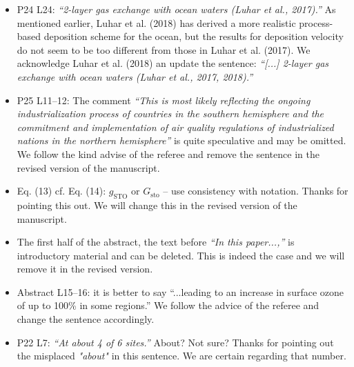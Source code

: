 \documentclass{scrartcl}
\begin{document}
\begin{itemize}
\item {\color{blue}  P24 L24: \emph{“2-layer gas exchange with ocean waters (Luhar et al., 2017).”}
As mentioned earlier, Luhar et al. (2018) has derived a more realistic process-based
deposition scheme for the ocean, but the results for deposition velocity do not seem to
be too different from those in Luhar et al. (2017).}
  We acknowledge Luhar et al. (2018) an update the sentence:
  \emph{“[...] 2-layer gas exchange with ocean waters (Luhar et al., 2017, 2018).”}
  
\item {\color{blue}  P25 L11--12: The comment \emph{“This is most likely reflecting the ongoing
industrialization process of countries in the southern hemisphere and the commitment
and implementation of air quality regulations of industrialized nations in the northern
hemisphere”} is quite speculative and may be omitted.}
  We follow the kind advise of the referee and remove the sentence in the revised version of the manuscript.
  
\item {\color{blue}  Eq. (13) cf. Eq. (14): $g_\mathrm{STO}$ or $G_\mathrm{sto}$ -- use consistency with notation.}
  Thanks for pointing this out. We will change this in the revised version of the manuscript.
  
\item {\color{blue}  The first half of the abstract, the text before \emph{“In this paper...,”} is introductory
  material and can be deleted.}
  This is indeed the case and we will remove it in the revised version.
  
\item {\color{blue}  Abstract L15--16: it is better to say “...leading to an increase in surface
  ozone of up to 100\% in some regions.”}
  We follow the advice of the referee and change the sentence accordingly.
  
\item {\color{blue}  P22 L7: \emph{“At about 4 of 6 sites.”} About? Not sure?}
  Thanks for pointing out the misplaced \emph{"about"} in this sentence. We are certain regarding that number. 
  
\end{itemize}
\newpage
\end{document}
